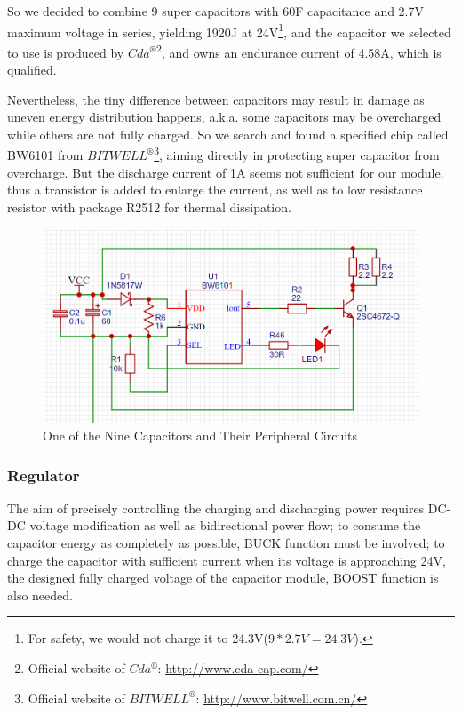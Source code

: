\documentclass[a4paper,num-refs]{oup-contemporary}
\begin{document}
So we decided to combine 9 super capacitors with 60F capacitance and 2.7V maximum voltage in series, yielding 1920J at 24V\footnote{For safety, we would not charge it to 24.3V($ 9*2.7V = 24.3V $).}, and the capacitor we selected to use is produced by $ Cda^{\circledR} $\footnote{Official website of $ Cda^{\circledR} $: \href{http://www.cda-cap.com/}{http://www.cda-cap.com/}}, and owns an endurance current of 4.58A, which is qualified.

Nevertheless, the tiny difference between capacitors may result in damage as uneven energy distribution happens, a.k.a. some capacitors may be overcharged while others are not fully charged. So we search and found a specified chip called BW6101 from $ BITWELL^{\circledR} $\footnote{Official website of $ BITWELL^{\circledR} $: \href{http://www.bitwell.com.cn/}{http://www.bitwell.com.cn/}}, aiming directly in protecting super capacitor from overcharge. But the discharge current of 1A seems not sufficient for our module, thus a transistor is added to enlarge the current, as well as to low resistance resistor with package R2512 for thermal dissipation.

\begin{figure}[h]
	\centering
	\includegraphics[width=0.8\linewidth]{SuperCapacitor.png}
	\caption{One of the Nine Capacitors and Their Peripheral Circuits}
\end{figure} 

\subsubsection{Regulator}
The aim of precisely controlling the charging and discharging power requires DC-DC voltage modification as well as bidirectional power flow; to consume the capacitor energy as completely as possible, BUCK function must be involved; to charge the capacitor with sufficient current when its voltage is approaching 24V, the designed fully charged voltage of the capacitor module, BOOST function is also needed.
\end{document}
